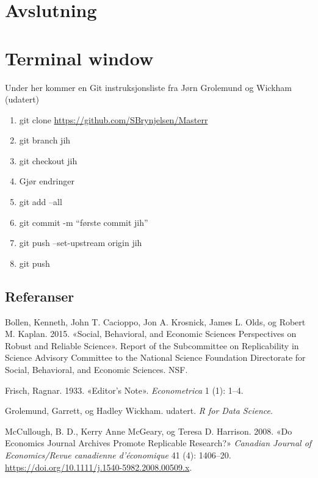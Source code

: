 \documentclass[
  12pt,
  norsk,
]{article}
\providecommand{\tightlist}{%
  \setlength{\itemsep}{0pt}\setlength{\parskip}{0pt}}
\begin{document}
\newpage

\hypertarget{avslutning}{%
\section{Avslutning}\label{avslutning}}

\hypertarget{terminal-window}{%
\section{Terminal window}\label{terminal-window}}

Under her kommer en Git instruksjonsliste fra Jørn Grolemund og Wickham
(udatert)

\begin{enumerate}
\def\labelenumi{\arabic{enumi}.}
\tightlist
\item
  git clone \url{https://github.com/SBrynjelsen/Masterr}
\item
  git branch jih
\item
  git checkout jih
\item
  Gjør endringer
\item
  git add --all
\item
  git commit -m ``første commit jih''
\item
  git push --set-upstream origin jih
\item
  git push
\end{enumerate}

\hypertarget{referanser}{%
\subsection{Referanser}\label{referanser}}

\hypertarget{refs}{}
\leavevmode\hypertarget{ref-bollen2015}{}%
Bollen, Kenneth, John T. Cacioppo, Jon A. Krosnick, James L. Olds, og
Robert M. Kaplan. 2015. «Social, Behavioral, and Economic Sciences
Perspectives on Robust and Reliable Science». Report of the Subcommittee
on Replicability in Science Advisory Committee to the National Science
Foundation Directorate for Social, Behavioral, and Economic Sciences.
NSF.

\leavevmode\hypertarget{ref-frisch1933}{}%
Frisch, Ragnar. 1933. «Editor's Note». \emph{Econometrica} 1 (1): 1--4.

\leavevmode\hypertarget{ref-grolemund}{}%
Grolemund, Garrett, og Hadley Wickham. udatert. \emph{R for Data
Science}.

\leavevmode\hypertarget{ref-mccullough2008}{}%
McCullough, B. D., Kerry Anne McGeary, og Teresa D. Harrison. 2008. «Do
Economics Journal Archives Promote Replicable Research?» \emph{Canadian
Journal of Economics/Revue canadienne d'économique} 41 (4): 1406--20.
\url{https://doi.org/10.1111/j.1540-5982.2008.00509.x}.
\end{document}
